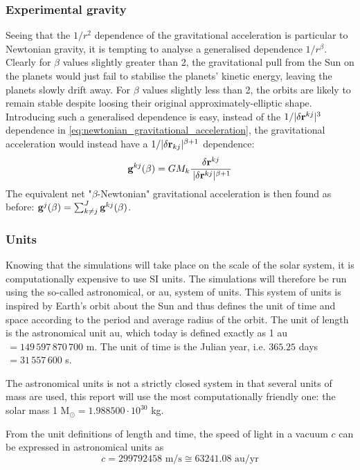 \documentclass[reprint,english]{revtex4-1}
\begin{document}
\subsubsection{Experimental gravity}
Seeing that the \(1/r^2\) dependence of the gravitational acceleration is particular to Newtonian gravity, it is tempting to analyse a generalised dependence \(1/r^\beta\). Clearly for \(\beta\) values slightly greater than 2, the gravitational pull from the Sun on the planets would just fail to stabilise the planets' kinetic energy, leaving the planets slowly drift away. For \(\beta\) values slightly less than 2, the orbits are likely to remain stable despite loosing their original approximately-elliptic shape. Introducing such a generalised dependence is easy, instead of the \(1/|\delta\vb{r}^{kj}|^3\) dependence in \eqref{eq:newtonian_gravitational_acceleration}, the gravitational acceleration would instead have a \(1/|\delta\vb{r}_{kj}|^{\beta+1}\) dependence:
\begin{equation}\label{eq:beta_Newtonian_gravitational_acceleration}
\vb{g}^{kj}(\beta)=GM_k\frac{\delta\vb{r}^{kj}}{\,|\delta\vb{r}^{kj}|^{\beta+1}}
\end{equation}
The equivalent net "\(\beta\)-Newtonian" gravitational acceleration is then found as before: \(\vb{g}^j(\beta)=\sum_{k\neq j}^J\vb{g}^{kj}(\beta)\).
\subsubsection{Units}
Knowing that the simulations will take place on the scale of the solar system, it is computationally expensive to use SI units. The simulations will therefore be run using the so-called astronomical, or au, system of units. This system of units is inspired by Earth's orbit about the Sun and thus defines the unit of time and space according to the period and average radius of the orbit. The unit of length is the astronomical unit au, which today is defined exactly as 1 au\(\,=149\,597\,870\,700\) m. The unit of time is the Julian year, i.e. \(365.25\) days\(\,=31\,557\,600\) s.

The astronomical units is not a strictly closed system in that several units of mass are used, this report will use the most computationally friendly one: the solar mass 1 \(\text{M}_\odot=1.988500\cdot10^{30}\) kg.

From the unit definitions of length and time, the speed of light in a vacuum \(c\) can be expressed in astronomical units as
\begin{equation}\label{eq:light_speed_au_units}
c=299 792 458\text{ m/s}\cong63241.08\text{ au/yr}
\end{equation}
\end{document}
